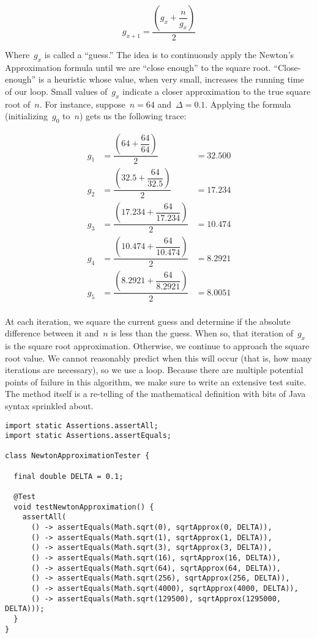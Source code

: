 \[
    g_{x+1} = \dfrac{\left(g_x + \dfrac{n}{g_x}\right)}{2}
\]

Where~$g_x$ is called a ``guess.'' 
The idea is to continuously apply the Newton's Approximation formula until we are ``close enough'' to the square root. 
``Close-enough'' is a heuristic whose value, when very small, increases the running time of our loop. 
Small values of~$g_x$ indicate a closer approximation to the true square root of~$n$. 
For instance, suppose~$n=64$ and~$\Delta=0.1$. 
Applying the formula (initializing~$g_0$ to~$n$) gets us the following trace:

\begin{align*}
g_1 &= \dfrac{\left(64 + \dfrac{64}{64}\right)}{2} &= 32.500\\
g_2 &= \dfrac{\left(32.5 + \dfrac{64}{32.5}\right)}{2} &= 17.234\\
g_3 &= \dfrac{\left(17.234 + \dfrac{64}{17.234}\right)}{2} &= 10.474\\
g_4 &= \dfrac{\left(10.474 + \dfrac{64}{10.474}\right)}{2} &= 8.2921\\
g_5 &= \dfrac{\left(8.2921 + \dfrac{64}{8.2921}\right)}{2} &= 8.0051\\
\end{align*}

At each iteration, we square the current guess and determine if the absolute difference between it and~$n$ is less than the guess. 
When so, that iteration of~$g_x$ is the square root approximation. 
Otherwise, we continue to approach the square root value. 
We cannot reasonably predict when this will occur (that is, how many iterations are necessary), so we use a  loop. 
Because there are multiple potential points of failure in this algorithm, we make sure to write an extensive test suite. 
The method itself is a re-telling of the mathematical definition with bits of Java syntax sprinkled about. 

\begin{lstlisting}[language=MyJava]
import static Assertions.assertAll;
import static Assertions.assertEquals;

class NewtonApproximationTester {

  final double DELTA = 0.1;

  @Test
  void testNewtonApproximation() {
    assertAll(
      () -> assertEquals(Math.sqrt(0), sqrtApprox(0, DELTA)),
      () -> assertEquals(Math.sqrt(1), sqrtApprox(1, DELTA)),
      () -> assertEquals(Math.sqrt(3), sqrtApprox(3, DELTA)),
      () -> assertEquals(Math.sqrt(16), sqrtApprox(16, DELTA)),
      () -> assertEquals(Math.sqrt(64), sqrtApprox(64, DELTA)),
      () -> assertEquals(Math.sqrt(256), sqrtApprox(256, DELTA)),
      () -> assertEquals(Math.sqrt(4000), sqrtApprox(4000, DELTA)),
      () -> assertEquals(Math.sqrt(129500), sqrtApprox(1295000, DELTA)));
  }
}
\end{lstlisting}


